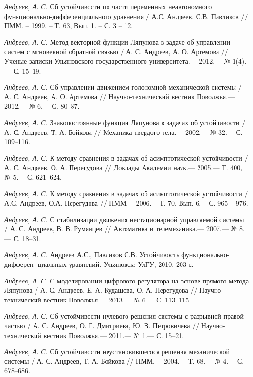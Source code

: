 \begin{thebibliography}{10}
	{\it Андреев, А. С.} Об устойчивости по части переменных неавтономного функционально-дифференциального уравнения / А.С. Андреев, С.В. Павликов // ПММ. – 1999. – Т. 63, Вып. 1. – С. 3 – 12.
	
	{\it Андреев, А. С.} Метод векторной функции Ляпунова в задаче об управлении систем
	с мгновенной обратной связью / А. С. Андреев, А. О. Артемова // Ученые записки
	Ульяновского государственного университета.— 2012.— № 1(4).— С. 15–19.
	
	{\it Андреев, А. С.} Об управлении движением голономной механической системы / А. С. Андреев,
	А. О. Артемова // Научно-технический вестник Поволжья.— 2012.— № 6.— С. 80–87.
	
	{\it Андреев, А. С.} Знакопостоянные функции Ляпунова в задачах об устойчивости /
	А. С. Андреев, Т. А. Бойкова // Механика твердого тела.— 2002.— № 32.— С. 109–116.
	
	{\it Андреев, А. С.} К методу сравнения в задачах об асимптотической устойчивости /
	А. С. Андреев, О. А. Перегудова // Доклады Академии наук.— 2005.— Т. 400, № 5.—
	С. 621–624.
	
	{\it Андреев, А. С.} К методу сравнения в задачах об асимптотической устойчивости / А.С. Андреев, О.А. Перегудова // ПММ. – 2006. – Т. 70, Вып. 6. – С. 965 – 976.
	
	{\it Андреев, А. С.} О стабилизации движения нестационарной управляемой системы /
	А. С. Андреев, В. В. Румянцев // Автоматика и телемеханика.— 2007.— № 8.—
	С. 18–31.
	
	{\it Андреев, А. С.} Андреев А.С., Павликов С.В. Устойчивость функционально-дифферен-
	циальных уравнений. Ульяновск: УлГУ, 2010. 203 с.
	
	{\it Андреев, А. С.} О моделировании цифрового регулятора на основе прямого метода Ляпунова /
	А. С. Андреев, Е. А. Кудашова, О. А. Перегудова // Научно-технический вестник Поволжья.— 2013.— № 6.—
	С. 113–115.
	
	{\it Андреев, А. С.} Об устойчивости нулевого решения системы с разрывной правой частью /
	А. С. Андреев, О. Г. Дмитриева, Ю. В. Петровичева // Научно-технический вестник Поволжья.— 2011.— № 1.—
	С. 15–21.
	
	{\it Андреев, А. С.} Об устойчивости неустановившегося решения механической системы /
	А. С. Андреев, Т. А. Бойкова // ПММ.— 2004.— Т. 68.— № 4.— С. 678–686.
	

\end{thebibliography}
